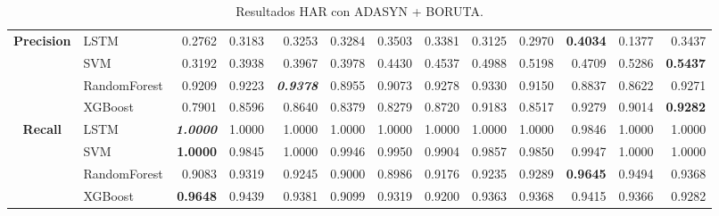 \begin{table}[H]
\begin{adjustbox}{max width=14cm}
\begin{tabular}{|c|l|r|r|r|r|r|r|r|r|r|r|r|}
			\hline
			\textbf{Precision} &  LSTM &  0.2762 &  0.3183 &  0.3253 &  0.3284 &  0.3503 &  0.3381 &  0.3125 &  0.2970 & \textbf{  0.4034 } &  0.1377 &  0.3437 \\
			&  SVM &  0.3192 &  0.3938 &  0.3967 &  0.3978 &  0.4430 &  0.4537 &  0.4988 &  0.5198 &  0.4709 &  0.5286 & \textbf{  0.5437 } \\
			&  RandomForest &  0.9209 &  0.9223 & \textit{ \textbf{  0.9378 } } &  0.8955 &  0.9073 &  0.9278 &  0.9330 &  0.9150 &  0.8837 &  0.8622 &  0.9271 \\
			&  XGBoost &  0.7901 &  0.8596 &  0.8640 &  0.8379 &  0.8279 &  0.8720 &  0.9183 &  0.8517 &  0.9279 &  0.9014 & \textbf{  0.9282 } \\
			\hline
			\textbf{Recall} &  LSTM & \textit{ \textbf{  1.0000 } } &  1.0000 &  1.0000 &  1.0000 &  1.0000 &  1.0000 &  1.0000 &  1.0000 &  0.9846 &  1.0000 &  1.0000 \\
			&  SVM & \textbf{  1.0000 } &  0.9845 &  1.0000 &  0.9946 &  0.9950 &  0.9904 &  0.9857 &  0.9850 &  0.9947 &  1.0000 &  1.0000 \\
			&  RandomForest &  0.9083 &  0.9319 &  0.9245 &  0.9000 &  0.8986 &  0.9176 &  0.9235 &  0.9289 & \textbf{  0.9645 } &  0.9494 &  0.9368 \\
			&  XGBoost & \textbf{  0.9648 } &  0.9439 &  0.9381 &  0.9099 &  0.9319 &  0.9200 &  0.9363 &  0.9368 &  0.9415 &  0.9366 &  0.9282 \\
			\hline
		\end{tabular}
	\end{adjustbox}
	\caption{Resultados HAR con ADASYN + BORUTA.}
	\label{tab:HAR_ADASYN_BORUTA}
\end{table}

